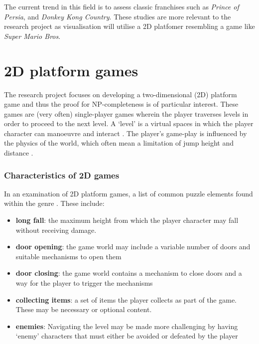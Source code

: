 \documentclass[11pt, a4paper, oneside]{report} %
\begin{document}
The current trend in this field is to assess classic franchises such as \textit{Prince of Persia},
and \textit{Donkey Kong Country}. These studies are more relevant to the research project as
visualisation will utilise a 2D platfomer resembling a game like \textit{Super Mario
Bros}.


\section{2D platform games}

The research project focuses on developing a two-dimensional (2D) platform game and thus the proof
for NP-completeness is of particular interest. These games are (very often) single-player games
wherein the player traverses levels in order to proceed to the next level. A `level' is a virtual
spaces in which the player character can manoeuvre and interact \cite{Burgun:2012}. The player's
game-play is influenced by the physics of the world, which often mean a limitation of jump height
and distance \cite{Burgun:2012}.

\subsubsection{Characteristics of 2D games} 

In an examination of 2D platform games, a list of common puzzle elements found within the genre
\cite{Smith:2008:FAP:1401843.1401858,DBLP:conf/fun/Forisek10}. These include:

\begin{itemize}

  \item \textbf{long fall}: the maximum height from which the player character may fall without
                            receiving damage.

  \item \textbf{door opening}: the game world may include a variable number of doors and
                               suitable mechanisms to open them 

  \item \textbf{door closing}: the game world contains a mechanism to close doors and a way for the
                               player to trigger the mechanisms

  \item \textbf{collecting items}: a set of items the player collects as part of the game. These may
                                   be necessary or optional content.

  \item \textbf{enemies}: Navigating the level may be made more challenging by having `enemy'
                          characters that must either be avoided or defeated by the player

\end{itemize}
\end{document}
